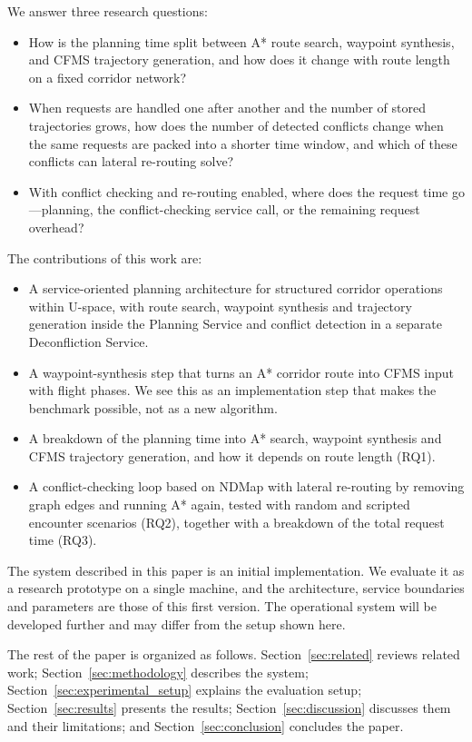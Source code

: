 We answer three research questions:
\begin{itemize}[leftmargin=3.6em,labelwidth=3em,align=left]
    \item[\textbf{RQ1}] How is the planning time split between A* route search, waypoint synthesis, and CFMS trajectory generation, and how does it change with route length on a fixed corridor network?
    \item[\textbf{RQ2}] When requests are handled one after another and the number of stored trajectories grows, how does the number of detected conflicts change when the same requests are packed into a shorter time window, and which of these conflicts can lateral re-routing solve?
    \item[\textbf{RQ3}] With conflict checking and re-routing enabled, where does the request time go---planning, the conflict-checking service call, or the remaining request overhead?
\end{itemize}

The contributions of this work are:
\begin{itemize}
    \item A service-oriented planning architecture for structured corridor operations within U-space, with route search, waypoint synthesis and trajectory generation inside the Planning Service and conflict detection in a separate Deconfliction Service.
    \item A waypoint-synthesis step that turns an A* corridor route into CFMS input with flight phases. We see this as an implementation step that makes the benchmark possible, not as a new algorithm.
    \item A breakdown of the planning time into A* search, waypoint synthesis and CFMS trajectory generation, and how it depends on route length (RQ1).
    \item A conflict-checking loop based on NDMap with lateral re-routing by removing graph edges and running A* again, tested with random and scripted encounter scenarios (RQ2), together with a breakdown of the total request time (RQ3).
\end{itemize}

The system described in this paper is an initial implementation. We evaluate it as a research prototype on a single machine, and the architecture, service boundaries and parameters are those of this first version. The operational system will be developed further and may differ from the setup shown here.

The rest of the paper is organized as follows. Section~\ref{sec:related} reviews related work; Section~\ref{sec:methodology} describes the system; Section~\ref{sec:experimental_setup} explains the evaluation setup; Section~\ref{sec:results} presents the results; Section~\ref{sec:discussion} discusses them and their limitations; and Section~\ref{sec:conclusion} concludes the paper.
